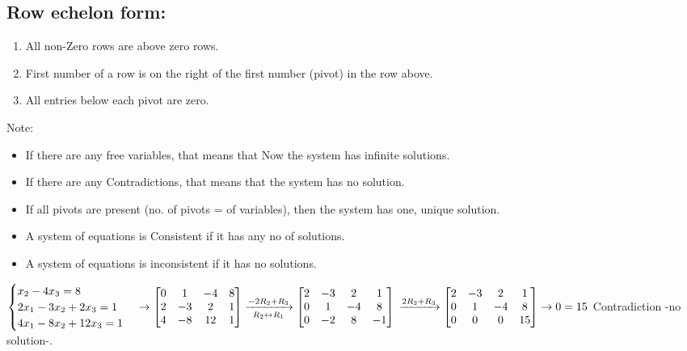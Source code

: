\documentclass{article}
\begin{document}
\subsection{Row echelon form:}
\begin{enumerate}
    \item All non-Zero rows are above zero rows.
    \item First number of a row is on the right of the first number (pivot) in the row above.
    \item All entries below each pivot are zero.
\end{enumerate}
Note:
\begin{itemize}
    \item If there are any free variables, that means that Now the system has infinite solutions.
    \item If there are any Contradictions, that means that the system has no solution.
    \item If all pivots are present (no. of pivots = of variables), then the system has one, unique solution.
    \item A system of equations is Consistent if it has any no of solutions. 
    \item A system of equations is inconsistent if
it has no solutions.
\end{itemize}
\begin{example}
    $\begin{cases}
        x_2-4x_3=8\\ 2x_1 -3x_2+2x_3=1 \\ 4x_1 -8x_2+12x_3=1 
    \end{cases} \rightarrow 
    \begin{bmatrix}
        0&1&-4&8 \\ 2&-3&2&1 \\ 4&-8&12&1 
    \end{bmatrix} \xrightarrow[R_2\leftrightarrow R_1]{-2R_2+R_3}
    \begin{bmatrix}
        2&-3&2&1 \\ 0&1&-4&8 \\ 0&-2&8&-1 
    \end{bmatrix}\\ \xrightarrow{2R_2+R_3}
    \begin{bmatrix}
        2&-3&2&1 \\ 0&1&-4&8 \\ 0&0&0&15 
    \end{bmatrix} \rightarrow 0=15$ Contradiction -no solution-.  
\end{example}
\end{document}
